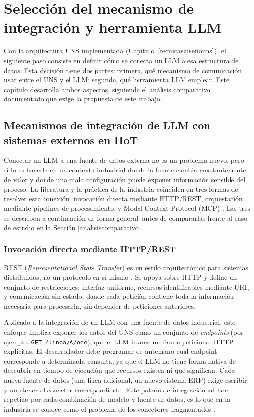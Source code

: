 \section{Selección del mecanismo de integración y herramienta LLM}
\label{seleccionllm}

Con la arquitectura UNS implementada (Capítulo~\ref{tecnicasdiseñouns}), el siguiente paso consiste en definir cómo se conecta un LLM a esa estructura de datos. Esta decisión tiene dos partes: primero, qué mecanismo de comunicación usar entre el UNS y el LLM; segundo, qué herramienta LLM emplear. Este capítulo desarrolla ambos aspectos, siguiendo el análisis comparativo documentado que exige la propuesta de este trabajo.

\subsection{Mecanismos de integración de LLM con sistemas externos en IIoT}
\label{mecanismosintegracion}

Conectar un LLM a una fuente de datos externa no es un problema nuevo, pero sí lo es hacerlo en un contexto industrial donde la fuente cambia constantemente de valor y donde una mala configuración puede exponer información sensible del proceso. La literatura y la práctica de la industria coinciden en tres formas de resolver esta conexión: invocación directa mediante HTTP/REST, orquestación mediante pipelines de procesamiento, y Model Context Protocol (MCP) \cite{MastouriRESTtoMCP2026, EhteshamAgentProtocols2025}. Las tres se describen a continuación de forma general, antes de compararlas frente al caso de estudio en la Sección \ref{analisiscomparativo}.

\subsubsection{Invocación directa mediante HTTP/REST}

REST (\textit{Representational State Transfer}) es un estilo arquitectónico para sistemas distribuidos, no un protocolo en sí mismo \cite{ReSTFielding2000}. Se apoya sobre HTTP y define un conjunto de restricciones: interfaz uniforme, recursos identificables mediante URI, y comunicación sin estado, donde cada petición contiene toda la información necesaria para procesarla, sin depender de peticiones anteriores.

Aplicado a la integración de un LLM con una fuente de datos industrial, este enfoque implica exponer los datos del UNS como un conjunto de \textit{endpoints} (por ejemplo, \texttt{GET /linea/A/oee}), que el LLM invoca mediante peticiones HTTP explícitas. El desarrollador debe programar de antemano cuál endpoint corresponde a determinada consulta, ya que el LLM no tiene forma nativa de descubrir en tiempo de ejecución qué recursos existen ni qué significan. Cada nueva fuente de datos (una línea adicional, un nuevo sistema ERP) exige escribir y mantener el conector correspondiente. Este patrón de integración ad hoc, repetido por cada combinación de modelo y fuente de datos, es lo que en la industria se conoce como el problema de los conectores fragmentados \cite{anthropic2024intro}.

